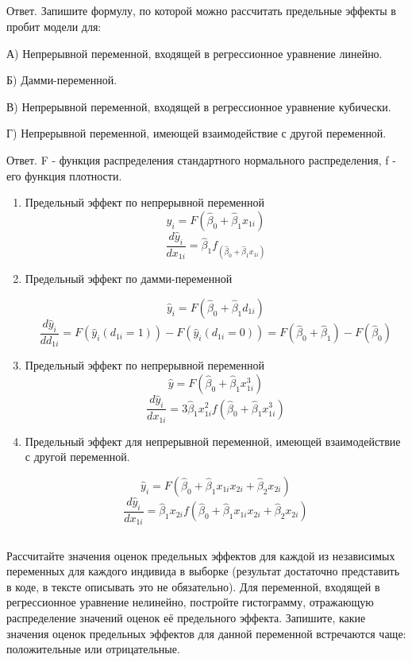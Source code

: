 \documentclass[a4paper,12pt]{article}
\def \hb{\hat{\beta}}
\def \hy{\hat{y}}
\def \hb{\hat{\beta}}
\begin{document}
\subsection{}
Ответ. Запишите формулу, по которой можно рассчитать предельные эффекты в
пробит модели для:

А) Непрерывной переменной, входящей в регрессионное уравнение линейно.

Б) Дамми-переменной.

В) Непрерывной переменной, входящей в регрессионное уравнение кубически.

Г) Непрерывной переменной, имеющей взаимодействие с другой переменной.

Ответ. F - функция распределения стандартного нормального распределения, f - его функция плотности.

\begin{enumerate}[\Sun]
	\item Предельный эффект по непрерывной переменной
	\[ \hat{y}_i = F(\hat{\beta}_0 + \hat{\beta}_1 x_{1i})\]
	\[ \frac{d\hy_i}{dx_{1i}} = \hb_1 f_(\hat{\beta}_0 + \hat{\beta}_1 x_{1i}) \]
	
	\item Предельный эффект по дамми-переменной
	
	\[ \hat{y}_i = F(\hat{\beta}_0 + \hat{\beta}_1 d_{1i})\]
	\[ \frac{d\hy_i}{dd_{1i}} = F(\hy_i(d_{1i}=1)) - F(\hy_i(d_{1i}=0)) =   F(\hat{\beta}_0 + \hat{\beta}_1) - F(\hat{\beta}_0) \]
	
	\item Предельный эффект по непрерывной переменной
	\[ \hat{y} = F(\hat{\beta}_0 + \hat{\beta}_1 x_{1i}^3)\]
	\[ \frac{d\hy_i}{dx_{1i}} = 3\hb_1x_{1i}^2 f(\hat{\beta}_0 + \hat{\beta}_1 x_{1i}^3) \]
	
	\item Предельный эффект для непрерывной переменной, имеющей взаимодействие с другой переменной.
	
	\[ \hat{y}_i = F(\hat{\beta}_0 + \hat{\beta}_1 x_{1i}x_{2i} + \hb_2 x_{2i})\]
	\[ \frac{d\hy_i}{dx_{1i}} = \hb_1 x_{2i} f(\hat{\beta}_0 + \hat{\beta}_1 x_{1i}x_{2i} + \hb_2 x_{2i}) \]	
\end{enumerate}

\subsection{}


\Sun Рассчитайте значения оценок предельных эффектов для каждой из
независимых переменных для каждого индивида в выборке (результат достаточно
представить в коде, в тексте описывать это не обязательно). Для переменной, входящей в
регрессионное уравнение нелинейно, постройте гистограмму, отражающую
распределение значений оценок её предельного эффекта. Запишите, какие значения
оценок предельных эффектов для данной переменной встречаются чаще: положительные
или отрицательные.
\end{document}
